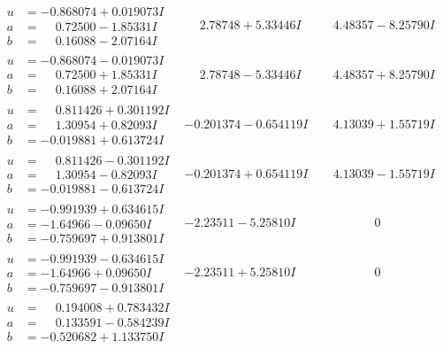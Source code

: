 \documentclass[1p]{elsarticle_modified}
\theoremstyle{definition}
\begin{document}
$$\begin{array}{c|c|c}
\begin{aligned}
u &= -0.868074 + 0.019073 I \\
a &= \phantom{-}0.72500 - 1.85331 I \\
b &= \phantom{-}0.16088 - 2.07164 I\end{aligned}
 & \phantom{-}2.78748 + 5.33446 I & \phantom{-}4.48357 - 8.25790 I \\ \hline\begin{aligned}
u &= -0.868074 - 0.019073 I \\
a &= \phantom{-}0.72500 + 1.85331 I \\
b &= \phantom{-}0.16088 + 2.07164 I\end{aligned}
 & \phantom{-}2.78748 - 5.33446 I & \phantom{-}4.48357 + 8.25790 I \\ \hline\begin{aligned}
u &= \phantom{-}0.811426 + 0.301192 I \\
a &= \phantom{-}1.30954 + 0.82093 I \\
b &= -0.019881 + 0.613724 I\end{aligned}
 & -0.201374 - 0.654119 I & \phantom{-}4.13039 + 1.55719 I \\ \hline\begin{aligned}
u &= \phantom{-}0.811426 - 0.301192 I \\
a &= \phantom{-}1.30954 - 0.82093 I \\
b &= -0.019881 - 0.613724 I\end{aligned}
 & -0.201374 + 0.654119 I & \phantom{-}4.13039 - 1.55719 I \\ \hline\begin{aligned}
u &= -0.991939 + 0.634615 I \\
a &= -1.64966 - 0.09650 I \\
b &= -0.759697 + 0.913801 I\end{aligned}
 & -2.23511 - 5.25810 I & \phantom{-0.000000 } 0 \\ \hline\begin{aligned}
u &= -0.991939 - 0.634615 I \\
a &= -1.64966 + 0.09650 I \\
b &= -0.759697 - 0.913801 I\end{aligned}
 & -2.23511 + 5.25810 I & \phantom{-0.000000 } 0 \\ \hline\begin{aligned}
u &= \phantom{-}0.194008 + 0.783432 I \\
a &= \phantom{-}0.133591 - 0.584239 I \\
b &= -0.520682 + 1.133750 I\end{aligned}

\end{array}$$
\end{document}
